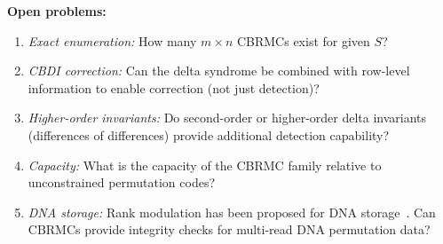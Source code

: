 \documentclass[11pt]{article}
\begin{document}
\textbf{Open problems:}
\begin{enumerate}
\item \emph{Exact enumeration:} How many $m \times n$ CBRMCs exist for given $S$?
\item \emph{CBDI correction:} Can the delta syndrome be combined with row-level information to enable correction (not just detection)?
\item \emph{Higher-order invariants:} Do second-order or higher-order delta invariants (differences of differences) provide additional detection capability?
\item \emph{Capacity:} What is the capacity of the CBRMC family relative to unconstrained permutation codes?
\item \emph{DNA storage:} Rank modulation has been proposed for DNA storage~\cite{farnoud2017}. Can CBRMCs provide integrity checks for multi-read DNA permutation data?
\end{enumerate}
\end{document}
